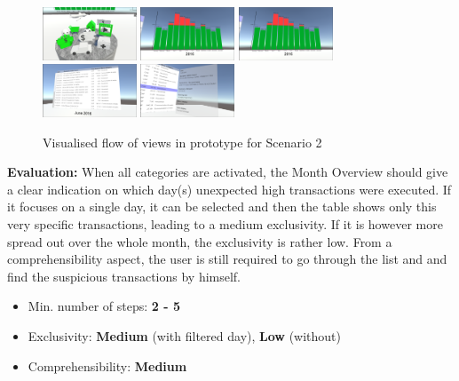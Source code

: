 \begin{figure}[h]
	\begin{center}
		\includegraphics[width=2.8cm]{03_Figures/08_Development/View4_CategoriesFiltering.png}
		\includegraphics[width=2.8cm]{03_Figures/08_Development/View1_YearOverview.png}
		\includegraphics[width=2.8cm]{03_Figures/08_Development/View1_YearOverview.png}
		\includegraphics[width=2.8cm]{03_Figures/08_Development/View5_FinTransactionsOverview.png}
		\includegraphics[width=2.8cm]{03_Figures/08_Development/View6_FinTransactionDetails.png}
		\caption{Visualised flow of views in prototype for Scenario 2}
		\label{fig:scenariothreeeprototype}
	\end{center}
\end{figure}

\textbf{Evaluation:} When all categories are activated, the Month Overview should give a clear indication on which day(s) unexpected high transactions were executed. If it focuses on a single day, it can be selected and then the table shows only this very specific transactions, leading to a medium exclusivity. If it is however more spread out over the whole month, the exclusivity is rather low. From a comprehensibility aspect, the user is still required to go through the list and and find the suspicious transactions by himself.
\begin{itemize}[noitemsep,nolistsep]
	\item Min. number of steps: \textbf{2 - 5}
	\item Exclusivity: \textbf{Medium} (with filtered day), \textbf{Low} (without)
	\item Comprehensibility: \textbf{Medium}
\end{itemize}


